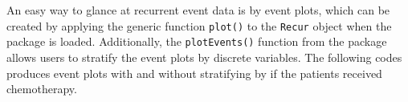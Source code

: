 An easy way to glance at recurrent event data is by event plots, which
can be created by applying the generic function \texttt{plot()} to the
\texttt{Recur} object when the  package is loaded.
Additionally, the \texttt{plotEvents()} function from the 
package allows users to stratify the event plots by discrete variables.
The following codes produces event plots with and without stratifying by
if the patients received chemotherapy.

\begin{Shaded}
\begin{Highlighting}[]
\StringTok{ }\OperatorTok{!}\StringTok{ }\NormalTok{(}\NormalTok{, }\NormalTok{, }\NormalTok{)))}
\StringTok{ }
 \NormalTok{) }
\StringTok{ }\OperatorTok{\textasciitilde{}}\StringTok{ }
 \NormalTok{) }
\end{Highlighting}
\end{Shaded}

